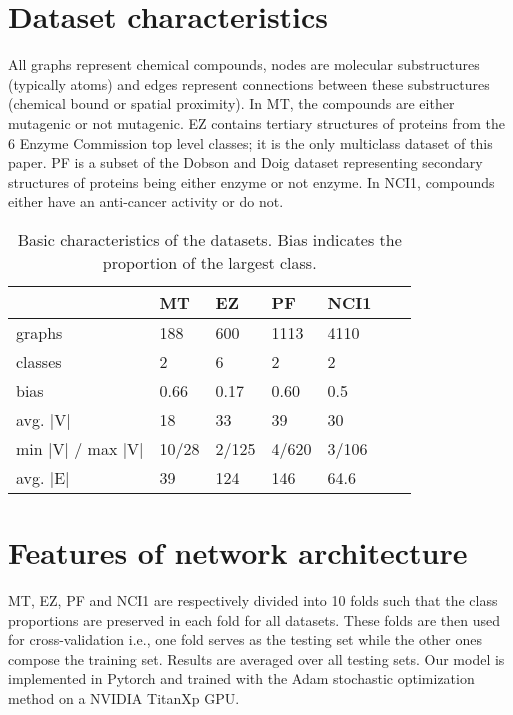 \documentclass{article} \usepackage{iclr2019_conference}
\begin{document}
\section{Dataset characteristics}
\label{app:datasets}
 All graphs represent chemical compounds, nodes are molecular substructures (typically atoms) and edges represent connections between these substructures (chemical bound or spatial proximity). In MT, the compounds are either mutagenic or not mutagenic. EZ contains tertiary structures of proteins from the 6 Enzyme Commission top level classes; it is the only multiclass dataset of this paper. PF is a subset of the Dobson and Doig dataset representing secondary structures of proteins being either enzyme or not enzyme. In NCI1, compounds either have an anti-cancer activity or do not. 

\begin{table}[h]
    \centering
    \renewcommand{\arraystretch}{1.4}
    \begin{tabular}{l|M{1.5cm} M{1.5cm} M{1.5cm} M{1.5cm} M{1.5cm} M{1.5cm}}
                          & MT   & EZ   & PF   &  NCI1 \\
        \hline
         graphs       & 188  & 600  & 1113 & 4110 \\
         classes      & 2    & 6    & 2    & 2    \\
        bias              & 0.66 & 0.17 & 0.60 & 0.5  \\
        avg. |V|          & 18   & 33   & 39   & 30 \\
        min |V| / max |V| & 10/28   & 2/125   & 4/620   & 3/106 \\
        avg. |E|          & 39   & 124  & 146  & 64.6 \\
    \end{tabular}
    \caption{Basic characteristics of the datasets. Bias indicates the proportion of the largest class.}
    \label{tab:datasets}
\end{table}



\section{Features of network architecture}
\label{app:architecture}

 MT, EZ, PF and NCI1 are respectively divided into 10 folds such that the class proportions are preserved in each fold for all datasets. These folds are then used for cross-validation i.e., one fold serves as the testing set while the other ones compose the training set. Results are averaged over all testing sets.
Our model is implemented in Pytorch \citep{paszke2017pytorch} and trained with the Adam stochastic optimization method \citep{kingma2014adam} on a NVIDIA TitanXp GPU. 
\end{document}
